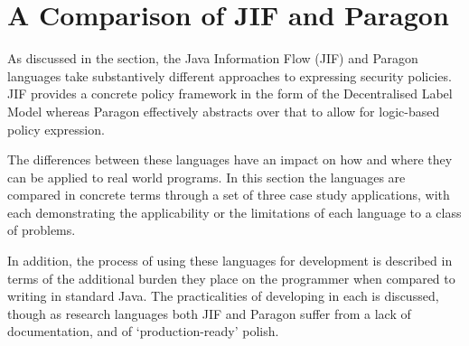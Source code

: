\chapter{A Comparison of JIF and Paragon}

As discussed in the  section, the Java Information Flow (JIF) and Paragon languages take substantively different approaches to expressing security policies. JIF provides a concrete policy framework in the form of the Decentralised Label Model whereas Paragon effectively abstracts over that to allow for logic-based policy expression.

The differences between these languages have an impact on how and where they can be applied to real world programs. In this section the languages are compared in concrete terms through a set of three case study applications, with each demonstrating the applicability or the limitations of each language to a class of problems.

In addition, the process of using these languages for development is described in terms of the additional burden they place on the programmer when compared to writing in standard Java. The practicalities of developing in each is discussed, though as research languages both JIF and Paragon suffer from a lack of documentation, and of `production-ready' polish.

\newpage



\newpage



\newpage




%

\newpage

